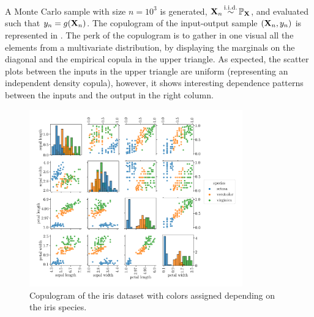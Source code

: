 A Monte Carlo sample with size $n=10^3$ is generated, ${\bf X}_n \mathop{\sim}\limits^{\mathrm{i.i.d.}} \mathbb{P}_{\bf X}$, and evaluated such that $y_n=g({\bf X}_n)$.  
The copulogram of the input-output sample $({\bf X}_n, y_n)$ is represented in . 
The perk of the copulogram is to gather in one visual all the elements from a multivariate distribution, by displaying the marginals on the diagonal and the empirical copula in the upper triangle. 
As expected, the scatter plots between the inputs in the upper triangle are uniform (representing an independent density copula), however, it shows interesting dependence patterns between the inputs and the output in the right column. 


\begin{figure}
    \centering
    \quad\qquad\qquad\includegraphics[width=0.82\textwidth]{../numerical_experiments/chapter3/figures/iris_copulogram.png}
    \caption{Copulogram of the iris dataset with colors assigned depending on the iris species.}
    \label{fig:iris_copulogram}
\end{figure}

